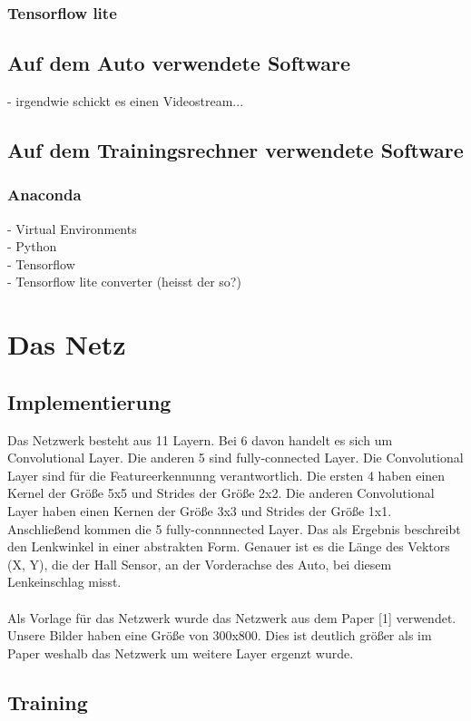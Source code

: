\documentclass[a4paper, 12pt]{scrartcl}
\begin{document}
			\subsubsection{Tensorflow lite}
		\subsection{Auf dem Auto verwendete Software}
		- irgendwie schickt es einen Videostream...
		\subsection{Auf dem Trainingsrechner verwendete Software}
			\subsubsection{Anaconda}
			- Virtual Environments \\
			- Python \\
			- Tensorflow \\
			- Tensorflow lite converter (heisst der so?) \\
			
		\section{Das Netz}
			\subsection{Implementierung}
			Das Netzwerk besteht aus 11 Layern. Bei 6 davon handelt es sich um Convolutional Layer. Die anderen 5 sind fully-connected Layer. Die Convolutional Layer sind für die Featureerkennunng verantwortlich. Die ersten 4 haben einen Kernel der Größe 5x5 und Strides der Größe 2x2. Die anderen Convolutional Layer haben einen Kernen der Größe 3x3 und Strides der Größe 1x1. Anschließend kommen die 5 fully-connnnected Layer. Das als Ergebnis beschreibt den Lenkwinkel in einer abstrakten Form. Genauer ist es die Länge des Vektors (X, Y), die der Hall Sensor, an der Vorderachse des Auto, bei diesem Lenkeinschlag misst.\\ \\
			Als Vorlage für das Netzwerk wurde das Netzwerk aus dem Paper [1] verwendet. Unsere Bilder haben eine Größe von 300x800. Dies ist deutlich größer als im Paper weshalb das Netzwerk um weitere Layer ergenzt wurde.
			
			\subsection{Training}
\end{document}
